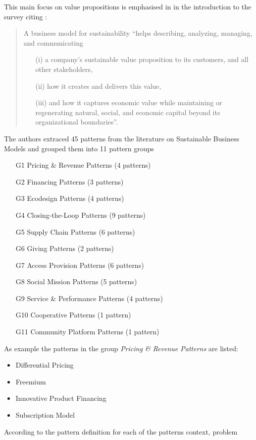 \documentclass[11pt,a4paper]{article}
\begin{document}
This main focus on value propositions is emphasised in \cite{LF2018} in the
introduction to the survey citing \cite{Schaltegger2016}:
\begin{quote}
  A business model for sustainability “helps describing, analyzing, managing,
  and communicating
  \begin{itemize}
  \item[(i)] a company’s sustainable value proposition to its customers, and
    all other stakeholders,
  \item[(ii)] how it creates and delivers this value,
  \item[(iii)] and how it captures economic value while maintaining or
    regenerating natural, social, and economic capital beyond its
    organizational boundaries”.
  \end{itemize}
\end{quote}
The authors extraced 45 patterns from the literature on Sustainable Business
Models and grouped them into 11 pattern groups
\begin{itemize}
\item[G1] Pricing \& Revenue Patterns (4 patterns)
\item[G2] Financing Patterns (3 patterns)
\item[G3] Ecodesign Patterns  (4 patterns)
\item[G4] Closing-the-Loop Patterns (9 patterns)
\item[G5] Supply Chain Patterns (6 patterns)
\item[G6] Giving Patterns (2 patterns)
\item[G7] Access Provision Patterns (6 patterns)
\item[G8] Social Mission Patterns (5 patterns)
\item[G9] Service \& Performance Patterns (4 patterns)
\item[G10] Cooperative Patterns (1 pattern)
\item[G11] Community Platform Patterns (1 pattern)
\end{itemize}
As example the patterns in the group \emph{Pricing \& Revenue Patterns} are
listed: 
\begin{itemize}
\item Differential Pricing
\item Freemium
\item Innovative Product Financing
\item Subscription Model
\end{itemize}
According to the pattern definition for each of the patterns context, problem
\end{document}
